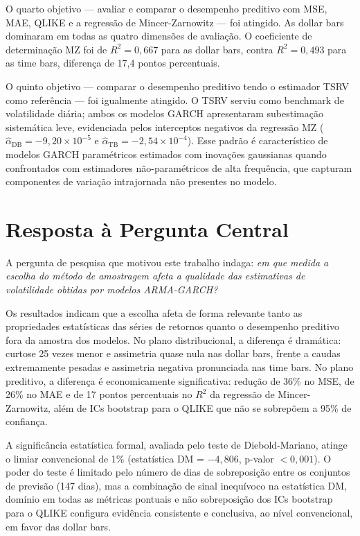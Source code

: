 O quarto objetivo — avaliar e comparar o desempenho preditivo com MSE, MAE, QLIKE e
a regressão de Mincer-Zarnowitz — foi atingido. As dollar bars dominaram em todas as
quatro dimensões de avaliação. O coeficiente de determinação MZ foi de $R^2 = 0{,}667$
para as dollar bars, contra $R^2 = 0{,}493$ para as time bars, diferença de 17,4 pontos
percentuais.

O quinto objetivo — comparar o desempenho preditivo tendo o estimador TSRV como
referência — foi igualmente atingido. O TSRV serviu como benchmark de volatilidade diária;
ambos os modelos GARCH apresentaram subestimação sistemática leve, evidenciada pelos
interceptos negativos da regressão MZ ($\hat{\alpha}_{\text{DB}} = -9{,}20 \times 10^{-5}$ e $\hat{\alpha}_{\text{TB}} = -2{,}54 \times 10^{-4}$). Esse padrão é característico de
modelos GARCH paramétricos estimados com inovações gaussianas quando confrontados com
estimadores não-paramétricos de alta frequência, que capturam componentes de variação
intrajornada não presentes no modelo.

\section{Resposta à Pergunta Central}
\label{sec:resposta_central}

A pergunta de pesquisa que motivou este trabalho indaga: \textit{em que medida a escolha
do método de amostragem afeta a qualidade das estimativas de volatilidade obtidas por
modelos ARMA-GARCH?}

Os resultados indicam que a escolha afeta de forma relevante tanto as propriedades
estatísticas das séries de retornos quanto o desempenho preditivo fora da amostra dos
modelos. No plano distribucional, a diferença é dramática: curtose 25 vezes menor e
assimetria quase nula nas dollar bars, frente a caudas extremamente pesadas e assimetria
negativa pronunciada nas time bars. No plano preditivo, a diferença é economicamente
significativa: redução de 36\% no MSE, de 26\% no MAE e de 17 pontos percentuais no
$R^2$ da regressão de Mincer-Zarnowitz, além de ICs bootstrap para o QLIKE que não
se sobrepõem a 95\% de confiança.

A significância estatística formal, avaliada pelo teste de Diebold-Mariano, atinge o limiar convencional de 1\% (estatística DM = $-4{,}806$, p-valor $< 0{,}001$). 
O poder do teste é limitado pelo número de dias de sobreposição entre os conjuntos de 
previsão (147 dias), mas a combinação de sinal inequívoco na estatística DM, domínio 
em todas as métricas pontuais e não sobreposição dos ICs bootstrap para o QLIKE 
configura evidência consistente e conclusiva, ao nível convencional, em favor das dollar bars.

